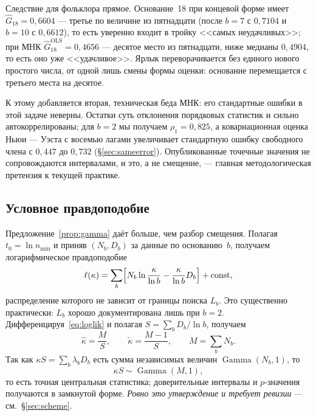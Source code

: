 \documentclass[11pt,a4paper]{article}
\theoremstyle{plain}
\theoremstyle{remark}
\DeclareMathOperator{\Gam}{Gamma}
\begin{document}
Следствие для фольклора прямое. Основание~18 при концевой форме имеет
$\hat G_{18}=0{,}6604$ --- третье по величине из пятнадцати (после $b=7$ с $0{,}7104$
и $b=10$ с $0{,}6612$), то есть уверенно входит в тройку <<самых неудачливых>>; при МНК
$\hat G_{18}^{\mathrm{OLS}}=0{,}4656$ --- десятое место из пятнадцати, ниже медианы
$0{,}4904$, то есть оно уже <<удачливое>>. Ярлык переворачивается без единого нового
простого числа, от одной лишь смены формы оценки: основание перемещается с третьего
места на десятое.

К этому добавляется вторая, техническая беда МНК: его стандартные ошибки в этой задаче
неверны. Остатки суть отклонения порядковых статистик и сильно автокоррелированы;
для $b=2$ мы получаем $\rho_1=0{,}825$, а ковариационная оценка Ньюи --- Уэста с восемью
лагами увеличивает стандартную ошибку свободного члена с $0{,}447$ до $0{,}732$
(\S\ref{sec:sameerror}). Опубликованные точечные значения не сопровождаются интервалами,
и это, а не смещение, --- главная методологическая претензия к текущей практике.

\subsection{Условное правдоподобие}\label{sec:condlik}

Предложение~\ref{prop:gamma} даёт больше, чем разбор смещения. Полагая $t_0=\ln n_{\min}$
и приняв $(N_b,D_b)$ за данные по основанию~$b$, получаем логарифмическое правдоподобие
\begin{equation}\label{eq:loglik}
\ell(\kappa)=\sum_b\Bigl[N_b\ln\frac{\kappa}{\ln b}-\frac{\kappa}{\ln b}D_b\Bigr]+\mathrm{const},
\end{equation}
распределение которого не зависит от границы поиска $L_b$. Это существенно практически:
$L_b$ хорошо документирована лишь при $b=2$. Дифференцируя~\eqref{eq:loglik} и полагая
$S=\sum_b D_b/\ln b$, получаем
\begin{equation}\label{eq:mle}
\hat\kappa=\frac{M}{S},\qquad \tilde\kappa=\frac{M-1}{S},\qquad M=\sum_b N_b .
\end{equation}
Так как $\kappa S=\sum_b\lambda_bD_b$ есть сумма независимых величин $\Gam(N_b,1)$, то
\begin{equation}\label{eq:pivot}
\kappa S\sim\Gam(M,1),
\end{equation}
то есть точная центральная статистика; доверительные интервалы и $p$-значения получаются
в замкнутой форме. \emph{Ровно это утверждение и требует ревизии} --- см.~\S\ref{sec:scheme}.
\end{document}
